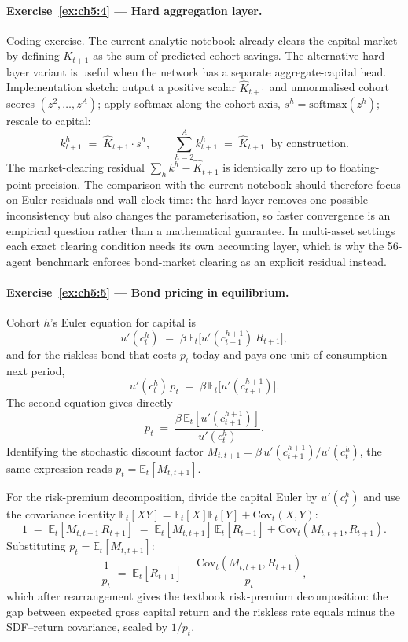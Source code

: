 \documentclass[11pt,a4paper]{report}
\begin{document}
\paragraph{Exercise~\ref{ex:ch5:4} --- Hard aggregation layer.}
Coding exercise.  The current analytic notebook already clears the capital market by defining $K_{t+1}$ as the sum of predicted cohort savings.  The alternative hard-layer variant is useful when the network has a separate aggregate-capital head.  Implementation sketch: output a positive scalar $\widehat K_{t+1}$ and unnormalised cohort scores $(z^2, \dots, z^A)$; apply softmax along the cohort axis, $s^h = \mathrm{softmax}(z^h)$; rescale to capital:
\[
   k_{t+1}^h \;=\; \widehat K_{t+1} \cdot s^h, \qquad
   \sum_{h=2}^{A} k_{t+1}^h \;=\; \widehat K_{t+1}\;\;\text{by construction}.
\]
The market-clearing residual $\sum_h k^h - \widehat K_{t+1}$ is identically zero up to floating-point precision.  The comparison with the current notebook should therefore focus on Euler residuals and wall-clock time: the hard layer removes one possible inconsistency but also changes the parameterisation, so faster convergence is an empirical question rather than a mathematical guarantee.  In multi-asset settings each exact clearing condition needs its own accounting layer, which is why the 56-agent benchmark enforces bond-market clearing as an explicit residual instead.

\paragraph{Exercise~\ref{ex:ch5:5} --- Bond pricing in equilibrium.}
Cohort $h$'s Euler equation for capital is
\[
   u'(c^h_t) \;=\; \beta\,\mathbb{E}_t\!\bigl[u'(c^{h+1}_{t+1})\,R_{t+1}\bigr],
\]
and for the riskless bond that costs $p_t$ today and pays one unit of consumption next period,
\[
   u'(c^h_t)\,p_t \;=\; \beta\,\mathbb{E}_t\!\bigl[u'(c^{h+1}_{t+1})\bigr].
\]
The second equation gives directly
\[
   p_t \;=\; \frac{\beta\,\mathbb{E}_t[u'(c^{h+1}_{t+1})]}{u'(c^h_t)}.
\]
Identifying the stochastic discount factor $M_{t,t+1} = \beta\,u'(c^{h+1}_{t+1})/u'(c^h_t)$, the same expression reads $p_t = \mathbb{E}_t[M_{t,t+1}]$.

For the risk-premium decomposition, divide the capital Euler by $u'(c^h_t)$ and use the covariance identity $\mathbb{E}_t[XY] = \mathbb{E}_t[X]\mathbb{E}_t[Y] + \mathrm{Cov}_t(X,Y)$:
\[
   1 \;=\; \mathbb{E}_t[M_{t,t+1}\,R_{t+1}]
       \;=\; \mathbb{E}_t[M_{t,t+1}]\,\mathbb{E}_t[R_{t+1}] + \mathrm{Cov}_t(M_{t,t+1}, R_{t+1}).
\]
Substituting $p_t = \mathbb{E}_t[M_{t,t+1}]$:
\[
   \frac{1}{p_t} \;=\; \mathbb{E}_t[R_{t+1}] + \frac{\mathrm{Cov}_t(M_{t,t+1}, R_{t+1})}{p_t},
\]
which after rearrangement gives the textbook risk-premium decomposition: the gap between expected gross capital return and the riskless rate equals minus the SDF--return covariance, scaled by $1/p_t$.
\end{document}
